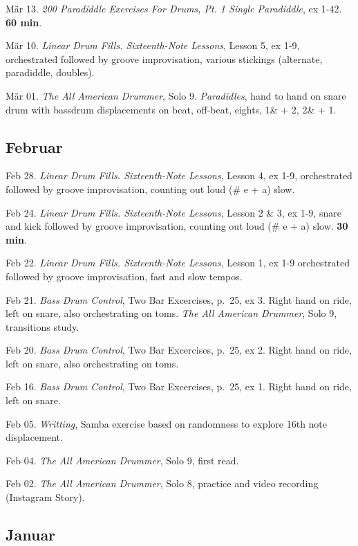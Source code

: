 \documentclass[
]{book}
\begin{document}
Mär 13. \emph{200 Paradiddle Exercises For Drums, Pt. 1 Single Paradiddle}, ex 1-42. \textbf{60 min}.

Mär 10. \emph{Linear Drum Fills. Sixteenth-Note Lessons}, Lesson 5, ex 1-9, orchestrated followed by groove improvisation, various stickings (alternate, paradiddle, doubles).

Mär 01. \emph{The All American Drummer}, Solo 9. \emph{Paradidles}, hand to hand on snare drum with bassdrum displacements on beat, off-beat, eights, 1\& + 2, 2\& + 1.

\subsection*{Februar}\label{februar-2023}

Feb 28. \emph{Linear Drum Fills. Sixteenth-Note Lessons}, Lesson 4, ex 1-9, orchestrated followed by groove improvisation, counting out loud (\# e + a) slow.

Feb 24. \emph{Linear Drum Fills. Sixteenth-Note Lessons}, Lesson 2 \& 3, ex 1-9, snare and kick followed by groove improvisation, counting out loud (\# e + a) slow. \textbf{30 min}.

Feb 22. \emph{Linear Drum Fills. Sixteenth-Note Lessons}, Lesson 1, ex 1-9 orchestrated followed by groove improvisation, fast and slow tempos.

Feb 21. \emph{Bass Drum Control}, Two Bar Excercises, p.~25, ex 3. Right hand on ride, left on snare, also orchestrating on toms. \emph{The All American Drummer}, Solo 9, transitions study.

Feb 20. \emph{Bass Drum Control}, Two Bar Excercises, p.~25, ex 2. Right hand on ride, left on snare, also orchestrating on toms.

Feb 16. \emph{Bass Drum Control}, Two Bar Excercises, p.~25, ex 1. Right hand on ride, left on snare.

Feb 05. \emph{Writting}, Samba exercise based on randomness to explore 16th note displacement.

Feb 04. \emph{The All American Drummer}, Solo 9, first read.

Feb 02. \emph{The All American Drummer}, Solo 8, practice and video recording (Instagram Story).

\subsection*{Januar}\label{januar-2023}
\end{document}
